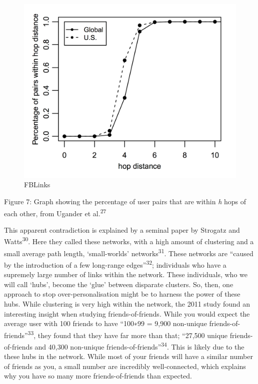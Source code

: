 \documentclass[]{article}
\begin{document}
\begin{figure}
\centering
\includegraphics{FBLinks.png}
\caption{FBLinks}
\end{figure}

Figure 7: Graph showing the percentage of user pairs that are within
\emph{h} hops of each other, from Ugander et al.\textsuperscript{27}

This apparent contradiction is explained by a seminal paper by Strogatz
and Watts\textsuperscript{30}. Here they called these networks, with a
high amount of clustering and a small average path length,
`small-worlds' networks\textsuperscript{31}. These networks are ``caused
by the introduction of a few long-range edges''\textsuperscript{32};
individuals who have a supremely large number of links within the
network. These individuals, who we will call `hubs', become the `glue'
between disparate clusters. So, then, one approach to stop
over-personalisation might be to harness the power of these hubs. While
clustering is very high within the network, the 2011 study found an
interesting insight when studying friends-of-friends. While you would
expect the average user with 100 friends to have ``100∗99 = 9,900
non-unique friends-of-friends''\textsuperscript{33}, they found that
they have far more than that; ``27,500 unique friends-of-friends and
40,300 non-unique friends-of-friends''\textsuperscript{34}. This is
likely due to the these hubs in the network. While most of your friends
will have a similar number of friends as you, a small number are
incredibly well-connected, which explains why you have so many more
friends-of-friends than expected.
\end{document}
